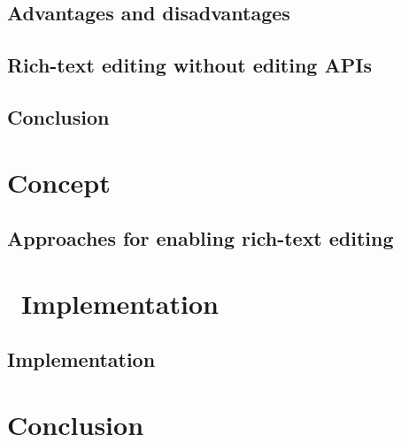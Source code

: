 




\chapter{Advantages and disadvantages}
\label{ch:editing_apis_adv_disadv}






\chapter{Rich-text editing without editing APIs}
\label{ch:editing_apis_alt}






\chapter{Conclusion}
\label{ch:approaches_conclusion}



\part{Concept}
\label{part-concept}

\chapter{Approaches for enabling rich-text editing}
\label{ch:approaches}



\part{\ Implementation}
\label{part:implementation}

\chapter{Implementation}
\label{ch:impl}



\part{Conclusion}
\label{part:evaluation}

